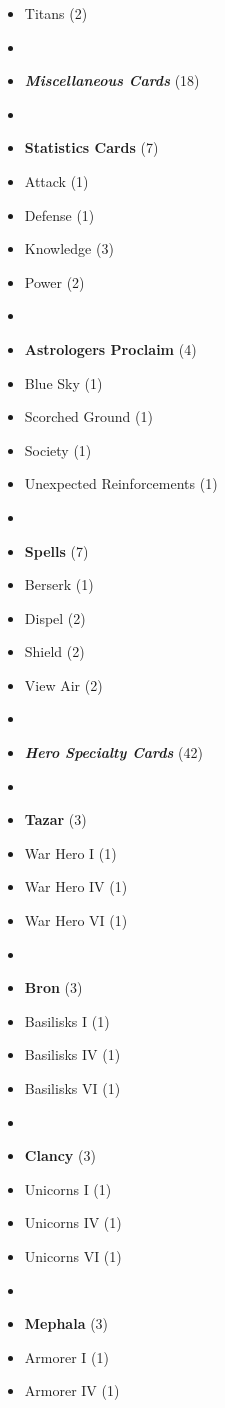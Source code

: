\begin{multicols}{3}
\begin{itemize}[leftmargin=0pt, label={}, noitemsep]
  \item Titans (2)
  \item
  \item \textbf{\emph{Miscellaneous Cards}} (18)
  \item
  \item \textbf{Statistics Cards} (7)
  \item Attack (1)
  \item Defense (1)
  \item Knowledge (3)
  \item Power (2)
  \item
  \item \textbf{Astrologers Proclaim} (4)
  \item Blue Sky (1)
  \item Scorched Ground (1)
  \item Society (1)
  \item Unexpected Reinforcements (1)
  \item
  \item \textbf{Spells} (7)
  \item Berserk (1)
  \item Dispel (2)
  \item Shield (2)
  \item View Air (2)
  \item
  \item \textbf{\emph{Hero Specialty Cards}} (42)
  \item
  \item \textbf{Tazar} (3)
  \item War Hero I (1)
  \item War Hero IV (1)
  \item War Hero VI (1)
  \item
  \item \textbf{Bron} (3)
  \item Basilisks I (1)
  \item Basilisks IV (1)
  \item Basilisks VI (1)
  \item
  \item \textbf{Clancy} (3)
  \item Unicorns I (1)
  \item Unicorns IV (1)
  \item Unicorns VI (1)
  \item
  \item \textbf{Mephala} (3)
  \item Armorer I (1)
  \item Armorer IV (1)

\end{itemize}
\end{multicols}

